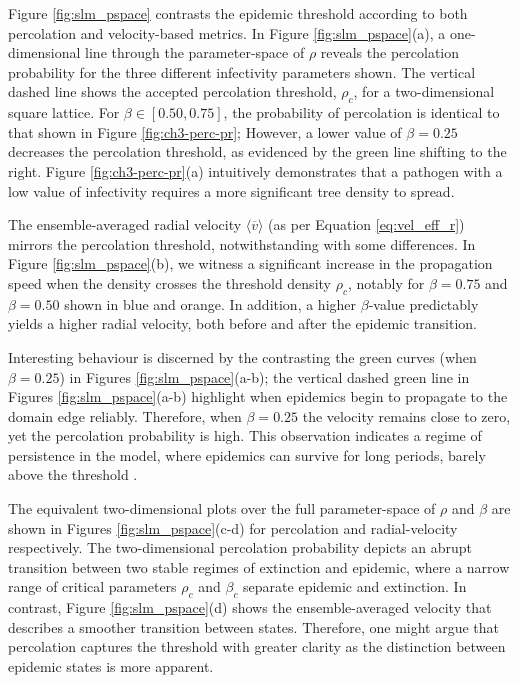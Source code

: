 Figure \ref{fig:slm_pspace} contrasts the epidemic threshold according to both percolation and velocity-based metrics.
In Figure \ref{fig:slm_pspace}(a), a one-dimensional line through the parameter-space of $\rho$ reveals the percolation probability for the three different infectivity parameters shown.
The vertical dashed line shows the accepted percolation threshold, $\rho_c$, for a two-dimensional square lattice. 
For $\beta \in [0.50, 0.75]$, the probability of percolation is identical to that shown in Figure \ref{fig:ch3-perc-pr};
However, a lower value of $\beta = 0.25$ decreases the percolation threshold, as evidenced by the green line shifting to the right.
Figure \ref{fig:ch3-perc-pr}(a) intuitively demonstrates that a pathogen with a low value of infectivity requires a more significant tree density to spread.

The ensemble-averaged radial velocity $\big\langle \overline{v} \big\rangle$ (as per Equation \ref{eq:vel_eff_r}) mirrors the percolation threshold,
notwithstanding with some differences.
In Figure \ref{fig:slm_pspace}(b), we witness a significant increase in the propagation speed when the density crosses the threshold density $\rho_c$, 
notably for $\beta=0.75$ and $\beta=0.50$ shown in blue and orange. 
In addition, a higher $\beta$-value predictably yields a higher radial velocity, both before and after the epidemic transition.

Interesting behaviour is discerned by the contrasting the green curves (when $\beta=0.25$) in Figures \ref{fig:slm_pspace}(a-b);
the vertical dashed green line in Figures \ref{fig:slm_pspace}(a-b) highlight when epidemics begin to propagate to the domain edge reliably.
Therefore, when $\beta=0.25$ the velocity remains close to zero, yet the percolation probability is high. 
This observation indicates a regime of persistence in the model, where epidemics can survive for long periods, barely above the threshold \cite{gilligan2008epidemiological}.

The equivalent two-dimensional plots over the full parameter-space of $\rho$ and $\beta$ are shown in Figures \ref{fig:slm_pspace}(c-d) for percolation and radial-velocity respectively. 
The two-dimensional percolation probability depicts an abrupt transition between two stable regimes of extinction and epidemic, where
a narrow range of critical parameters $\rho_c$ and $\beta_c$ separate epidemic and extinction.
In contrast, Figure \ref{fig:slm_pspace}(d) shows the ensemble-averaged velocity that describes a smoother transition between states.
Therefore, one might argue that percolation captures the threshold with greater clarity as the distinction between epidemic states is more apparent.


